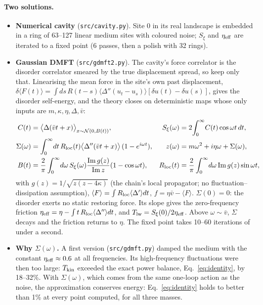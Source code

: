 \documentclass[10pt,a4paper]{article}
\begin{document}
\paragraph{Two solutions.}
\begin{itemize}
\item \textbf{Numerical cavity} (\texttt{src/cavity.py}). Site 0 in its real landscape is embedded in a ring of 63--127 linear medium sites with coloured noise; $S_\xi$ and $\eta_{\rm eff}$ are iterated to a fixed point (6 passes, then a polish with 32 rings).
\item \textbf{Gaussian DMFT} (\texttt{src/gdmft2.py}). The cavity's force correlator is the disorder correlator smeared by the true displacement spread, so keep only that. Linearising the mean force in the site's own past displacement, $\delta\langle F(t)\rangle=\int ds\,R(t-s)\langle\Delta''(u_t-u_s)\rangle[\delta u(t)-\delta u(s)]$, gives the disorder self-energy, and the theory closes on deterministic maps whose only inputs are $m,\kappa,\eta,\Delta,\bar v$:
\begin{align}
C(t)&=\big\langle\Delta(\bar vt+x)\big\rangle_{x\sim\mathcal N(0,B(t))}, &
S_\xi(\omega)&=2\!\int_0^\infty\!C(t)\cos\omega t\,dt,\nonumber\\
\Sigma(\omega)&=\int_0^\infty\!dt\,R_{\rm loc}(t)\big\langle\Delta''(\bar vt+x)\big\rangle\,(1-e^{i\omega t}), &
z(\omega)&=m\omega^2+i\eta\omega+\Sigma(\omega),\nonumber\\
B(t)&=\frac2\pi\int_0^\infty\!d\omega\,S_\xi(\omega)\frac{\mathrm{Im}\,g(z)}{\mathrm{Im}\,z}(1-\cos\omega t), &
R_{\rm loc}(t)&=\frac2\pi\int_0^\infty\!d\omega\,\mathrm{Im}\,g(z)\sin\omega t,
\label{eq:gdmft}
\end{align}
with $g(z)=1/\sqrt{z(z-4\kappa)}$ (the chain's local propagator; no fluctuation--dissipation assumption), $\langle F\rangle=\int R_{\rm loc}\langle\Delta'\rangle dt$, $f=\eta\bar v-\langle F\rangle$. $\Sigma(0)=0$: the disorder exerts no static restoring force. Its slope gives the zero-frequency friction $\eta_{\rm eff}=\eta-\int t\,R_{\rm loc}\langle\Delta''\rangle dt$, and $T_{\rm lw}=S_\xi(0)/2\eta_{\rm eff}$. Above $\omega\sim\bar v$, $\Sigma$ decays and the friction returns to $\eta$. The fixed point takes 10--60 iterations of under a second.
\item \textbf{Why $\Sigma(\omega)$.} A first version (\texttt{src/gdmft.py}) damped the medium with the constant $\eta_{\rm eff}\approx0.6$ at all frequencies. Its high-frequency fluctuations were then too large: $T_{\rm kin}$ exceeded the exact power balance, Eq.~\eqref{eq:identity}, by 18--32\%. With $\Sigma(\omega)$, which comes from the same one-loop action as the noise, the approximation conserves energy: Eq.~\eqref{eq:identity} holds to better than 1\% at every point computed, for all three masses.
\end{itemize}
\end{document}
